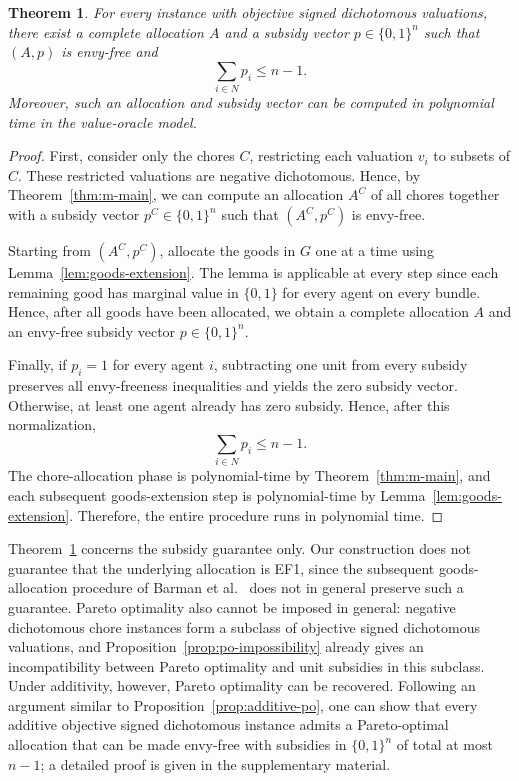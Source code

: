 \documentclass[sigconf,anonymous]{aamas}
\theoremstyle{acmplain}
\newtheorem{theorem}{Theorem}[section]
\theoremstyle{acmdefinition}
\theoremstyle{acmplain}
\begin{document}
\begin{theorem}
\label{thm:objective-mixed}
For every instance with objective signed dichotomous valuations, there exist a complete allocation $A$ and a subsidy vector $p\in\{0,1\}^n$ such that $(A,p)$ is envy-free and
\[
\sum_{i\in N} p_i\leq n-1.
\]
Moreover, such an allocation and subsidy vector can be computed in polynomial time in the value-oracle model.
\end{theorem}

\begin{proof}
First, consider only the chores $C$, restricting each valuation $v_i$ to subsets of $C$. These restricted valuations are negative dichotomous. Hence, by Theorem~\ref{thm:m-main}, we can compute an allocation $A^C$ of all chores together with a subsidy vector $p^C\in\{0,1\}^n$ such that $(A^C,p^C)$ is envy-free.

Starting from $(A^C,p^C)$, allocate the goods in $G$ one at a time using Lemma~\ref{lem:goods-extension}. The lemma is applicable at every step since each remaining good has marginal value in $\{0,1\}$ for every agent on every bundle. Hence, after all goods have been allocated, we obtain a complete allocation $A$ and an envy-free subsidy vector $p\in\{0,1\}^n$.

Finally, if $p_i=1$ for every agent $i$, subtracting one unit from every subsidy preserves all envy-freeness inequalities and yields the zero subsidy vector. Otherwise, at least one agent already has zero subsidy. Hence, after this normalization,
\[
\sum_{i\in N}p_i\leq n-1.
\]
The chore-allocation phase is polynomial-time by Theorem~\ref{thm:m-main}, and each subsequent goods-extension step is polynomial-time by Lemma~\ref{lem:goods-extension}. Therefore, the entire procedure runs in polynomial time.
\end{proof}

Theorem~\ref{thm:objective-mixed} concerns the subsidy guarantee only. Our construction does not guarantee that the underlying allocation is EF1, since the subsequent goods-allocation procedure of Barman et al.~\cite{BKNS22} does not in general preserve such a guarantee. Pareto optimality also cannot be imposed in general: negative dichotomous chore instances form a subclass of objective signed dichotomous valuations, and Proposition~\ref{prop:po-impossibility} already gives an incompatibility between Pareto optimality and unit subsidies in this subclass. Under additivity, however, Pareto optimality can be recovered. Following an argument similar to Proposition~\ref{prop:additive-po}, one can show that every additive objective signed dichotomous instance admits a Pareto-optimal allocation that can be made envy-free with subsidies in $\{0,1\}^n$ of total at most $n-1$; a detailed proof is given in the
supplementary material.







\end{document}
